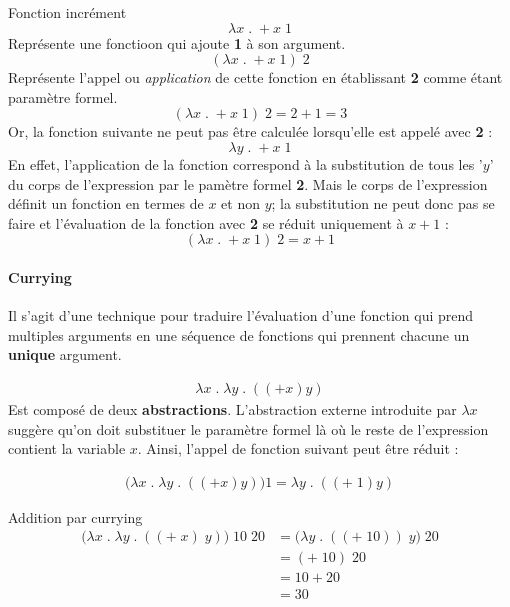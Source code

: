 \documentclass{report}
\begin{document}
\begin{multicols*}{3}
    \begin{EExample}{Fonction incrément}{}
        $$\lambda x \; . \;  + x \; 1$$ 
        Représente une fonctioon qui ajoute 
        \textbf{1} à son argument.   
        $$(\lambda x \; . \;  + x \; 1) \; 2$$  
        Représente l'appel ou \textit{application} de cette fonction 
        en établissant 
        \textbf{2} comme étant paramètre formel.   
        $$(\lambda x \; . \;  + x \; 1) \; 2 = 2 + 1 = 3$$ 
        Or, la fonction suivante ne peut pas être calculée lorsqu'elle 
        est appelé avec \textbf{2}  :
        $$\lambda y \; . \;  + x \; 1$$ 
        En effet, l'application de la fonction correspond à la substitution 
        de tous les '$y$' du corps de l'expression par le pamètre formel
        \textbf{2}. Mais le corps de l'expression définit un fonction 
        en termes de $x$ et non $y$; la substitution ne peut donc pas 
        se faire et l'évaluation de la fonction avec \textbf{2} se réduit 
        uniquement à $x + 1$ : 
        $$(\lambda x \; . \;  + x \; 1) \; 2 = x + 1 $$ 

        \end{EExample}


    \paragraph{Currying}
    Il s'agit d'une technique pour traduire l'évaluation d'une fonction 
    qui prend multiples arguments en une séquence de fonctions 
    qui prennent chacune un \textbf{unique} argument.   

    \begin{EExample}{}{}
        \begin{align*}
          \lambda x \; . \; \lambda y \; . \; ((+ x) y)
        \end{align*}
        Est composé de deux \textbf{abstractions}. L'abstraction externe 
        introduite par $\lambda x$ suggère qu'on doit substituer le 
        paramètre formel là où le reste de l'expression contient 
        la variable $x$. Ainsi, l'appel de fonction suivant peut être 
        réduit : 

        \begin{align*}
          \bigl(\lambda x \; . \; \lambda y \; . \; ((+ x) y)\bigr) 1
          =
          \lambda y \; . \; ((+ \; 1)y) 
        \end{align*}
    \end{EExample}


      \begin{EExample}{Addition par currying}{}
         \begin{align*}
            \bigl( \lambda x \; . \; \lambda y \; . \; ((+ \; x) \;y)\bigr)
            \; 10 \; 20 &= \bigl( \lambda y \; . \; ((+ \; 10)) \; y \bigr) 
            \; 20 \\ 
                    &= (+ \; 10) \; 20 \\          
                    &= 10 + 20 \\
                    &= 30 
          \end{align*}
      \end{EExample}



\end{multicols*}
\end{document}
